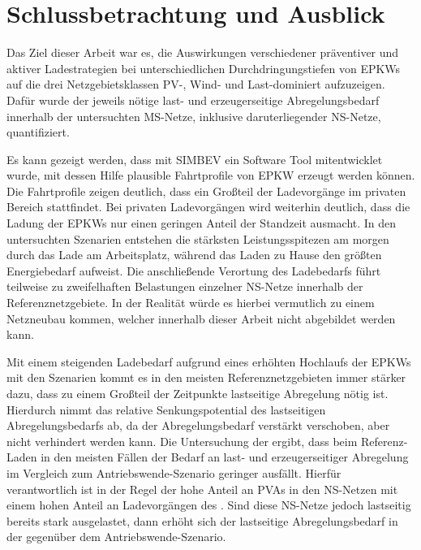 \section{Schlussbetrachtung und Ausblick}\label{chap:schlussbetrachtung}

Das Ziel dieser Arbeit war es, die Auswirkungen verschiedener präventiver und aktiver Ladestrategien bei unterschiedlichen Durchdringungstiefen von \glspl{EPKW} auf die drei Netzgebietsklassen \gls{PV}-, Wind- und Last-dominiert aufzuzeigen.
Dafür wurde der jeweils nötige last- und erzeugerseitige Abregelungsbedarf innerhalb der untersuchten \gls{MS}-Netze, inklusive daruterliegender \gls{NS}-Netze, quantifiziert.\medskip

Es kann gezeigt werden, dass mit \gls{SIMBEV} ein Software Tool mitentwicklet wurde, mit dessen Hilfe plausible Fahrtprofile von \gls{EPKW} erzeugt werden können.
Die Fahrtprofile zeigen deutlich, dass ein Großteil der Ladevorgänge im privaten Bereich stattfindet.
Bei privaten Ladevorgängen wird weiterhin deutlich, dass die Ladung der \glspl{EPKW} nur einen geringen Anteil der Standzeit ausmacht.
In den untersuchten Szenarien entstehen die stärksten Leistungsspitezen am morgen durch das Lade am Arbeitsplatz, während das Laden zu Hause den größten Energiebedarf aufweist.
Die anschließende Verortung des Ladebedarfs führt teilweise zu zweifelhaften Belastungen einzelner \gls{NS}-Netze innerhalb der Referenznetzgebiete.
In der Realität würde es hierbei vermutlich zu einem Netzneubau kommen, welcher innerhalb dieser Arbeit nicht abgebildet werden kann.\medskip

Mit einem steigenden Ladebedarf aufgrund eines erhöhten Hochlaufs der \glspl{EPKW} mit den Szenarien kommt es in den meisten Referenznetzgebieten immer stärker dazu, dass zu einem Großteil der Zeitpunkte lastseitige Abregelung nötig ist.
Hierdurch nimmt das relative Senkungspotential des lastseitigen Abregelungsbedarfs ab, da der Abregelungsbedarf verstärkt verschoben, aber nicht verhindert werden kann.
Die Untersuchung der \SzeFirmenparkplatz ergibt, dass beim Referenz-Laden in den meisten Fällen der Bedarf an last- und erzeugerseitiger Abregelung im Vergleich zum Antriebswende-Szenario geringer ausfällt.
Hierfür verantwortlich ist in der Regel der hohe Anteil an \glspl{PVA} in den \gls{NS}-Netzen mit einem hohen Anteil an Ladevorgängen des \UC \zHdot.
Sind diese \gls{NS}-Netze jedoch lastseitig bereits stark ausgelastet, dann erhöht sich der lastseitige Abregelungsbedarf in der \SzeFirmenparkplatz gegenüber dem Antriebswende-Szenario.\medskip

